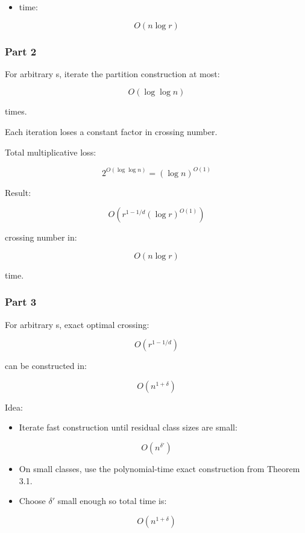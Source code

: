 \documentclass[
  11pt,
]{article}
\providecommand{\tightlist}{%
  \setlength{\itemsep}{0pt}\setlength{\parskip}{0pt}}
\begin{document}
\begin{itemize}
\tightlist
\item
  time:
\end{itemize}

\[
O(n\log r)
\]

\hypertarget{part-2}{%
\subsubsection{Part 2}\label{part-2}}

For arbitrary s, iterate the partition construction at most:

\[
O(\log\log n)
\]

times.

Each iteration loses a constant factor in crossing number.

Total multiplicative loss:

\[
2^{O(\log\log n)} = (\log n)^{O(1)}
\]

Result:

\[
O(r^{1-1/d}(\log r)^{O(1)})
\]

crossing number in:

\[
O(n\log r)
\]

time.

\hypertarget{part-3}{%
\subsubsection{Part 3}\label{part-3}}

For arbitrary s, exact optimal crossing:

\[
O(r^{1-1/d})
\]

can be constructed in:

\[
O(n^{1+\delta})
\]

Idea:

\begin{itemize}
\tightlist
\item
  Iterate fast construction until residual class sizes are small:
\end{itemize}

\[
O(n^{\delta'})
\]

\begin{itemize}
\tightlist
\item
  On small classes, use the polynomial-time exact construction from
  Theorem 3.1.
\item
  Choose \(\delta'\) small enough so total time is:
\end{itemize}

\[
O(n^{1+\delta})
\]
\end{document}
